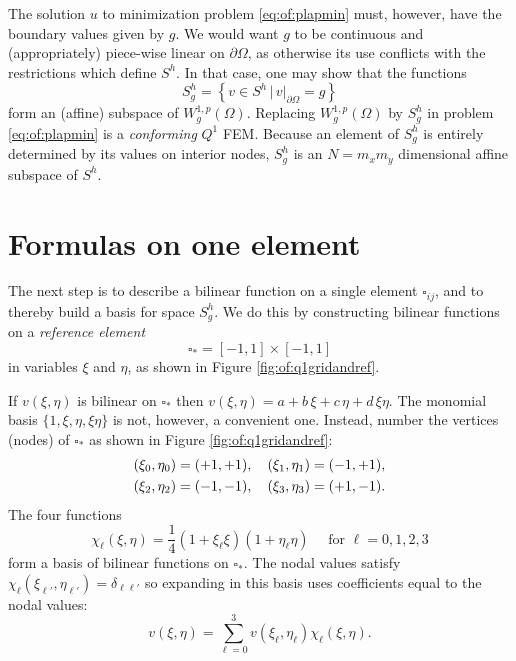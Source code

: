 The solution $u$ to minimization problem \eqref{eq:of:plapmin} must, however, have the boundary values given by $g$.  We would want $g$ to be continuous and (appropriately) piece-wise linear on $\partial\Omega$, as otherwise its use conflicts with the restrictions which define $S^h$.  In that case, one may show that the functions
\begin{equation}
S_g^h = \left\{v \in S^h \, \Big| \, v|_{\partial \Omega} = g\right\} \label{eq:of:Sghdefn}
\end{equation}
form an (affine) subspace of $W_g^{1,p}(\Omega)$.  Replacing $W_g^{1,p}(\Omega)$ by $S_g^h$ in problem \eqref{eq:of:plapmin} is a \emph{conforming} $Q^1$ FEM.  Because an element of $S_g^h$ is entirely determined by its values on interior nodes, $S_g^h$ is an $N=m_x m_y$ dimensional affine subspace of $S^h$.


\section{Formulas on one element}

The next step is to describe a bilinear function on a single element $\square_{ij}$, and to thereby build a basis for space $S_g^h$.  We do this by constructing bilinear functions on a \emph{reference element}
    $$\square_\ast = [-1,1]\times[-1,1]$$
in variables $\xi$ and $\eta$, as shown in Figure \ref{fig:of:q1gridandref}.

If $v(\xi,\eta)$ is bilinear on $\square_\ast$ then $v(\xi,\eta) = a + b\, \xi + c\, \eta + d\, \xi \eta$.  The monomial basis $\{1,\xi,\eta,\xi\eta\}$ is not, however, a convenient one.  Instead, number the vertices (nodes) of $\square_\ast$ as shown in Figure \ref{fig:of:q1gridandref}:
\begin{align}
(\xi_0,\eta_0) &= (+1,+1), \quad (\xi_1,\eta_1) = (-1,+1),    \label{eq:of:refcorners} \\
(\xi_2,\eta_2) &= (-1,-1), \quad (\xi_3,\eta_3) = (+1,-1). \notag
\end{align}
The four functions
\begin{equation}
\chi_\ell(\xi,\eta) = \frac{1}{4} \left(1 + \xi_\ell \xi\right) \left(1 + \eta_\ell \eta\right)  \quad \text{ for } \ell=0,1,2,3 \label{eq:of:chidefn}
\end{equation}
form a basis of bilinear functions on $\square_\ast$.  The nodal values satisfy $\chi_\ell(\xi_{\ell'},\eta_{\ell'}) = \delta_{\ell\ell'}$ so expanding in this basis uses coefficients equal to the nodal values:
\begin{equation}
v(\xi,\eta) = \sum_{\ell=0}^3 v(\xi_\ell,\eta_\ell) \chi_\ell(\xi,\eta). \label{eq:of:bilinearrepresentationref}
\end{equation}

